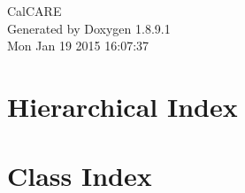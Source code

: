 \documentclass[twoside]{book}
\newcommand{\+}{\discretionary{\mbox{\scriptsize$\hookleftarrow$}}{}{}}
\newcommand{\clearemptydoublepage}{%
  \newpage{\pagestyle{empty}\cleardoublepage}%
}
\begin{document}
\hypersetup{pageanchor=false,
             bookmarks=true,
             bookmarksnumbered=true,
             pdfencoding=unicode
            }
\begin{titlepage}
\vspace*{7cm}
\begin{center}%
{\Large Cal\+C\+A\+R\+E }\\
\vspace*{1cm}
{\large Generated by Doxygen 1.8.9.1}\\
\vspace*{0.5cm}
{\small Mon Jan 19 2015 16:07:37}\\
\end{center}
\end{titlepage}
\clearemptydoublepage
\tableofcontents
\clearemptydoublepage
{}
\hypersetup{pageanchor=true}

\chapter{Hierarchical Index}

\chapter{Class Index}

\end{document}
